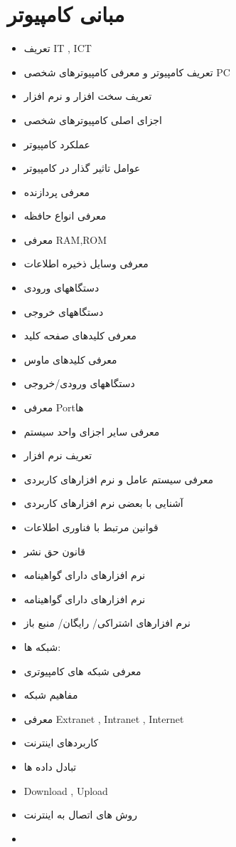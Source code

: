 \section{مبانی کامپیوتر}

\begin{itemize}
\item
تعریف IT , ICT
\item
تعریف کامپیوتر و معرفی کامپیوترهای شخصی PC
\item
تعریف سخت افزار و نرم افزار
\item
اجزای اصلی کامپیوترهای شخصی
\item
عملکرد کامپیوتر
\item
عوامل تاثیر گذار در کامپیوتر
\item
معرفی پردازنده
\item
معرفی انواع حافظه
\item
معرفی RAM,ROM
\item
معرفی وسایل ذخیره اطلاعات
\item
دستگاههای ورودی
\item
دستگاههای خروجی
\item
معرفی کلیدهای صفحه کلید
\item
معرفی کلیدهای ماوس
\item
دستگاههای ورودی/خروجی
\item
معرفی Portها
\item
معرفی سایر اجزای واحد سیستم
\item
تعریف نرم افزار
\item
معرفی سیستم عامل و نرم افزارهای کاربردی
\item
آشنایی با بعضی نرم افزارهای کاربردی
\item
قوانین مرتبط با فناوری اطلاعات
\item
قانون حق نشر
\item
نرم افزارهای دارای گواهینامه
\item
نرم افزارهای دارای گواهینامه
\item
نرم افزارهای اشتراکی/ رایگان/ منبع باز
\item
شبکه ها:
\item
معرفی شبکه های کامپیوتری
\item
مفاهیم شبکه
\item
معرفی Extranet , Intranet , Internet
\item
کاربردهای اینترنت
\item
تبادل داده ها
\item
Download , Upload
\item
روش های اتصال به اینترنت
\item

\end{itemize}

